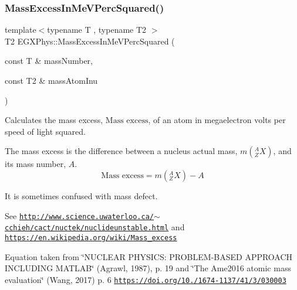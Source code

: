 \subsubsection{\texorpdfstring{Mass\+Excess\+In\+Me\+V\+Perc\+Squared()}{MassExcessInMeVPercSquared()}}
{\footnotesize\ttfamily template$<$typename T , typename T2 $>$ \\
T2 E\+G\+X\+Phys\+::\+Mass\+Excess\+In\+Me\+V\+Perc\+Squared (\begin{DoxyParamCaption}\item[{const T \&}]{mass\+Number,  }\item[{const T2 \&}]{mass\+Atom\+Inu }\end{DoxyParamCaption})}



Calculates the mass excess, $\text{Mass excess}$, of an atom in megaelectron volts per speed of light squared. 

The mass excess is the difference between a nucleus actual mass, $m({^A_ZX})$, and its mass number, $A$. \[\text{Mass excess} = m({^A_ZX}) - A\]

It is sometimes confused with mass defect.

See \href{http://www.science.uwaterloo.ca/~cchieh/cact/nuctek/nuclideunstable.html}{\tt http\+://www.\+science.\+uwaterloo.\+ca/$\sim$cchieh/cact/nuctek/nuclideunstable.\+html} and \href{https://en.wikipedia.org/wiki/Mass_excess}{\tt https\+://en.\+wikipedia.\+org/wiki/\+Mass\+\_\+excess}

Equation taken from \char`\"{}\+N\+U\+C\+L\+E\+A\+R P\+H\+Y\+S\+I\+C\+S\+: P\+R\+O\+B\+L\+E\+M-\/\+B\+A\+S\+E\+D A\+P\+P\+R\+O\+A\+C\+H I\+N\+C\+L\+U\+D\+I\+N\+G M\+A\+T\+L\+A\+B\char`\"{} (Agrawl, 1987), p. 19 and \char`\"{}\+The Ame2016 atomic mass evaluation\char`\"{} (Wang, 2017) p. 6 \href{https://doi.org/10.1088/1674-1137/41/3/030003}{\tt https\+://doi.\+org/10./1674-\/1137/41/3/030003}


